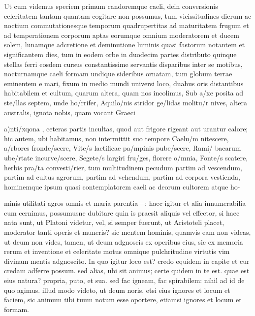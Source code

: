  Ut cum videmus speciem primum candoremque caeli, dein conversionis celeritatem tantam quantam cogitare non possumus, tum vicissitudines dierum ac noctium commutationesque temporum quadrupertitas ad maturitatem frugum et ad temperationem corporum aptas eorumque omnium moderatorem et ducem solem, lunamque adcretione et deminutione luminis quasi fastorum notantem et significantem dies, tum in eodem orbe in duodecim partes distributo quinque stellas ferri eosdem cursus constantissime servantis disparibus inter se motibus, nocturnamque caeli formam undique sideribus ornatam, tum globum terrae eminentem e mari, fixum in medio mundi universi loco, duabus oris distantibus habitabilem et cultum, quarum altera, quam nos incolimus, Sub a/xe posita ad ste/llas septem, unde ho/rrifer, Aquilo/nis stridor ge/lidas molitu/r nives, altera australis, ignota nobis, quam vocant Graeci

 a)nti/xqona , ceteras partis incultas, quod aut frigore rigeant aut urantur calore; hic autem, ubi habitamus, non intermittit suo tempore Caelu/m nitescere, a/rbores fronde/scere, Vite/s laetificae pa/mpinis pube/scere, Rami/ bacarum ube/rtate incurve/scere, Segete/s largiri fru/ges, florere o/mnia, Fonte/s scatere, herbis pra/ta convesti/rier, tum multitudinem pecudum partim ad vescendum, partim ad cultus agrorum, partim ad vehendum, partim ad corpora vestienda, hominemque ipsum quasi contemplatorem caeli ac deorum cultorem atque ho-

 minis utilitati agros omnis et maria parentia—: haec igitur et alia innumerabilia cum cernimus, possumusne dubitare quin is praesit aliquis vel effector, si haec nata sunt, ut Platoni videtur, vel, si semper fuerunt, ut Aristoteli placet, moderator tanti operis et muneris? sic mentem hominis, quamvis eam non videas, ut deum non vides, tamen, ut deum adgnoscis ex operibus eius, sic ex memoria rerum et inventione et celeritate motus omnique pulchritudine virtutis vim divinam mentis adgnoscito. In quo igitur loco est? credo equidem in capite et cur credam adferre possum. sed alias, ubi sit animus; certe quidem in te est. quae est eius natura? propria, puto, et sua. sed fac igneam, fac spirabilem: nihil ad id de quo agimus. illud modo videto, ut deum noris, etsi eius ignores et locum et faciem, sic animum tibi tuum notum esse oportere, etiamsi ignores et locum et formam.

